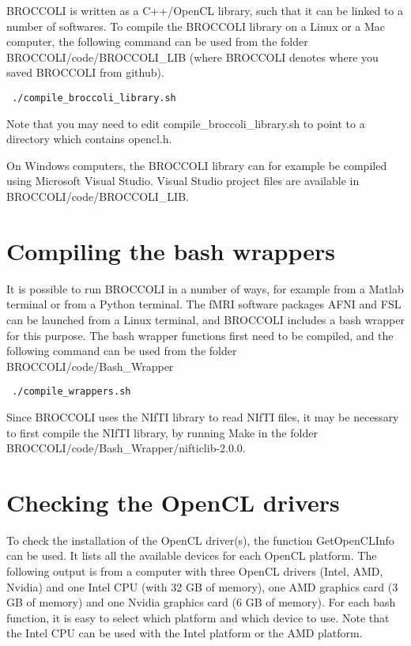 BROCCOLI is written as a C++/OpenCL library, such that it can be linked to a number of softwares. To compile the BROCCOLI library on a Linux or a Mac computer, the following command
can be used from the folder BROCCOLI/code/BROCCOLI\_LIB (where BROCCOLI denotes where you saved BROCCOLI from github).

\begin{verbatim}
 ./compile_broccoli_library.sh 
\end{verbatim}

Note that you may need to edit compile\_broccoli\_library.sh to point to a directory which contains opencl.h.

On Windows computers, the BROCCOLI library can for example be compiled using Microsoft Visual Studio. Visual Studio project files are available in BROCCOLI/code/BROCCOLI\_LIB. 

\section{Compiling the bash wrappers}

It is possible to run BROCCOLI in a number of ways, for example from a Matlab terminal or from a Python terminal. The fMRI software packages AFNI and FSL can be launched from a Linux terminal, and BROCCOLI includes a bash wrapper for this purpose. The bash wrapper functions first need to be compiled, and the following command can be used from the folder BROCCOLI/code/Bash\_Wrapper

\begin{verbatim}
 ./compile_wrappers.sh 
\end{verbatim}

Since BROCCOLI uses the NIfTI library to read NIfTI files, it may be necessary to first compile the NIfTI library, by running Make in the folder BROCCOLI/code/Bash\_Wrapper/nifticlib-2.0.0.


\section{Checking the OpenCL drivers}

To check the installation of the OpenCL driver(s), the function GetOpenCLInfo can be used. It lists all the available devices for each OpenCL platform. The following output is from a computer with three OpenCL drivers (Intel, AMD, Nvidia) and one Intel CPU (with 32 GB of memory), one AMD graphics card (3 GB of memory) and one Nvidia graphics card (6 GB of memory). For each bash function, it is easy to select which platform and which device to use. Note that the Intel CPU can be used with the Intel platform or the AMD platform. 

